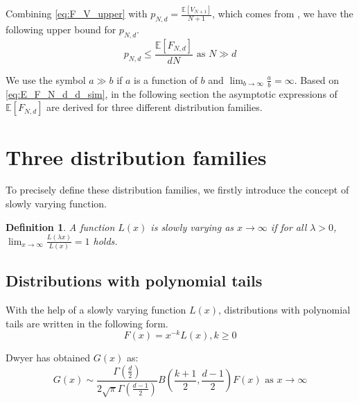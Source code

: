 \documentclass[conference,a4paper]{IEEEtran}
\def\E{\mathbb{E}}
\newtheorem{definition}{Definition}
\begin{document}
Combining \eqref{eq:F_V_upper} with $p_{N,d} = \frac{\E[V_{N+1}]}{N+1}$, which comes from
\cite{efron1965convex}, we have the following upper bound for $p_{N,d}$.
\begin{equation}\label{eq:p_N_d_bound}
    p_{N,d} \leq \frac{\E[F_{N,d}]}{d N} \textrm{ as } N \gg d
\end{equation}

We use the symbol $a \gg b$ if $a$ is a function of $b$ and $\lim_{b\to \infty} \frac{a}{b} = \infty$.
Based on \eqref{eq:E_F_N_d_d_sim}, in the following section
the asymptotic expressions of $\E[F_{N,d}]$ are derived
for three different distribution families.

\section{Three distribution families}\label{sec:three_distriutions}
To precisely define these distribution families, we firstly introduce the concept of slowly varying function.
\begin{definition}
A function $L(x)$ is
slowly varying as $x\to \infty$
if for all $\lambda>0$,
$\lim_{x\to\infty}\frac{L(\lambda x)}{L(x)}=1$
holds.
\end{definition}

\subsection{Distributions with polynomial tails}

With the help of a slowly varying function $L(x)$,
distributions with polynomial tails are written
in the following form.
\begin{equation}\label{eq:F_poly_tail}
     F(x) = x^{-k} L(x), k\geq 0
\end{equation}

Dwyer\cite{dwyer1991convex} has obtained $G(x)$ as:
\begin{equation}\label{eq:g_poly_tail}
     G(x) \sim \frac{\Gamma(\frac{d}{2})}{2\sqrt{\pi} \Gamma(\frac{d-1}{2})}
     B\left(\frac{k+1}{2}, \frac{d-1}{2}\right) F(x)  \textrm{ as } x\to \infty
\end{equation}
\end{document}
